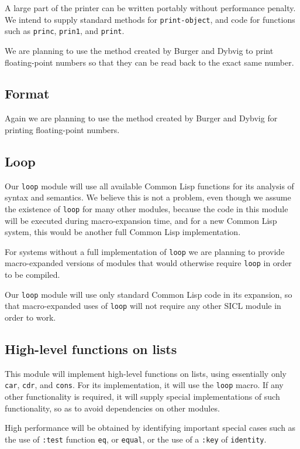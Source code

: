 \documentclass{article}
\def\sysname{SICL}
\begin{document}
A large part of the printer can be written portably without
performance penalty.  We intend to supply standard methods for
\texttt{print-object}, and code for functions such as \texttt{princ},
\texttt{prin1}, and \texttt{print}. 

We are planning to use the method created by Burger and Dybvig to
print floating-point numbers so that they can be read back to the
exact same number. 

\subsection{Format}

Again we are planning to use the method created by Burger and Dybvig
for printing floating-point numbers. 

\subsection{Loop}

Our \texttt{loop} module will use all available Common Lisp functions
for its analysis of syntax and semantics.  We believe this is not a
problem, even though we assume the existence of \texttt{loop} for many
other modules, because the code in this module will be executed during
macro-expansion time, and for a new Common Lisp system, this would be
another full Common Lisp implementation. 

For systems without a full implementation of \texttt{loop} we are
planning to provide macro-expanded versions of modules that would
otherwise require \texttt{loop} in order to be compiled. 

Our \texttt{loop} module will use only standard Common Lisp code in
its expansion, so that macro-expanded uses of \texttt{loop} will not
require any other \sysname{} module in order to work.  

\subsection{High-level functions on lists}

This module will implement high-level functions on lists, using
essentially only \texttt{car}, \texttt{cdr}, and \texttt{cons}.  For
its implementation, it will use the \texttt{loop} macro.  If any
other functionality is required, it will supply special
implementations of such functionality, so as to avoid dependencies on
other modules. 

High performance will be obtained by identifying important special
cases such as the use of \texttt{:test} function \texttt{eq}, or
\texttt{equal}, or the use of a \texttt{:key} of \texttt{identity}.
\end{document}
